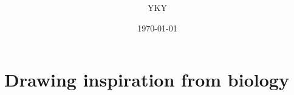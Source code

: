 

\usepackage{color}
\usepackage{mathtools}
\usepackage{hyperref}

%

\usepackage{graphicx} %
\usepackage{tikz-cd}
\usepackage{tikz}
\usepackage[export]{adjustbox}%
\usepackage{verbatim} %


\newcommand{\underdash}[1]{%
	\tikz[baseline=(toUnderline.base)]{
		\node[inner sep=1pt,outer sep=10pt] (toUnderline) {#1};
		\draw[dashed] ([yshift=-0pt]toUnderline.south west) -- ([yshift=-0pt]toUnderline.south east);
	}%
}%


\newcommand{\highlight}[1]{\colorbox{pink}{$\displaystyle #1$}}

\let\oldtextbf\textbf
\renewcommand{\textbf}[1]{\textcolor{blue}{\oldtextbf{#1}}}

\newcommand{\emp}[1]{{\color{blue}\textbf{#1}}}
\newcommand*\confoundFace{$\vcenter{\hbox{\texttt{[image: ../2020/../confounded-face.jpg]}}}$}
\newcommand{\underconst}{\texttt{[image: ../2020/UnderConst.png]}}
\newcommand{\witness}{\scalebox{0.6}{$\blacksquare$}}
\providecommand\Heytingarrow{\relbar\joinrel\mathrel{\vcenter{\hbox{\scalebox{0.75}{$\rhd$}}}}}



\title{\bfseries\color{blue}{\Huge《Steel wires as robotic muscles》}}
\author{YKY} %
\date{\today} %

\maketitle
{}

\section*{Drawing inspiration from biology}

